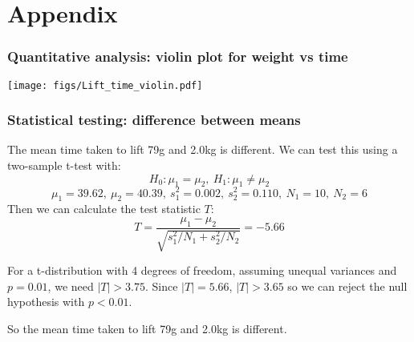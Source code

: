 \documentclass{beamer}
\begin{document}
\section{Appendix}
\begin{frame}
  \frametitle{Quantitative analysis: violin plot for weight vs time}
  \begin{center}
    \texttt{[image: figs/Lift\_time\_violin.pdf]}
  \end{center}
\end{frame}

\begin{frame}
  \frametitle{Statistical testing: difference between means}
  The mean time taken to lift 79g and 2.0kg is different. We can test this using a two-sample t-test with:
  $$H_0: \mu_1 = \mu_2,\ H_1: \mu_1 \neq \mu_2 $$
  $$ \mu_1 = 39.62,\ \mu_2 = 40.39,\ s^2_1 = 0.002,\ s^2_2 = 0.110,\ N_1 = 10,\ N_2 = 6$$
  Then we can calculate the test statistic $T$:
  $$T = \frac{\mu_1 - \mu_2}{\sqrt{s^2_1 / N_1 + s^2_2 / N_2}} = -5.66$$

  For a t-distribution with 4 degrees of freedom, assuming unequal variances and $p = 0.01$, we need $|T| > 3.75$. Since $|T| = 5.66$, $|T| > 3.65$ so we can reject the null hypothesis with $p < 0.01$.

  So the mean time taken to lift 79g and 2.0kg is different. 
\end{frame}
\end{document}
